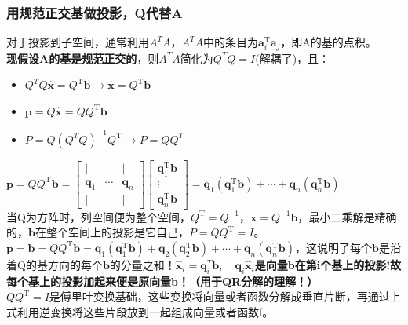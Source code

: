     \subsubsection{用规范正交基做投影，Q代替A}
    对于投影到子空间，通常利用$A^T A$，$A^T A$中的条目为$\boldsymbol{a}_{i}^{\mathrm{T}} \boldsymbol{a}_{j}$，即A的基的点积。\\
    \textbf{现假设A的基是规范正交的}，则$A^T A$简化为$Q^T Q=I$(解耦了)，且：
    \begin{itemize}
        \item $Q^T Q\widehat{\boldsymbol{x}}=Q^{\mathrm{T}} \boldsymbol{b} \rightarrow \widehat{\boldsymbol{x}}=Q^{\mathrm{T}} \boldsymbol{b}$
        \item $\bm{p}=Q \widehat{\bm{x}} = Q Q^{\mathrm{T}} \bm{b}$
        \item $P=Q(Q^T Q)^{-1}Q^{\mathrm{T}} \rightarrow P=Q Q^T$
    \end{itemize}
    $\boldsymbol{p}=Q Q^{\mathrm{T}} \bm{b}=\left[\begin{array}{lll}{|} & {} & { |} \\ {\bm{q}_{1}} & {\cdots} & {\bm{q}_{n}} \\ { |} & {} & { |}\end{array}\right]\left[\begin{array}{c}{\bm{q}_{1}^{\mathrm{T}} \bm{b}} \\ {\vdots} \\ {\bm{q}_{n}^{\mathrm{T}} \bm{b}}\end{array}\right]=\boldsymbol{q}_{1}\left(\boldsymbol{q}_{1}^{\mathrm{T}} \boldsymbol{b}\right)+\cdots+\boldsymbol{q}_{n}\left(\boldsymbol{q}_{n}^{\mathrm{T}} \boldsymbol{b}\right)$
    \\
    当Q为方阵时，列空间便为整个空间，$Q^{\mathrm{T}}=Q^{-1}$，$\boldsymbol{x}=Q^{-1} \boldsymbol{b}$，最小二乘解是精确的，$\bm{b}$在整个空间上的投影是它自己，$P=Q Q^{\mathrm{T}}=I$。
    \\
    $\boldsymbol{p}=\boldsymbol{b}=Q Q^{\mathrm{T}} \bm{b}=\bm{q}_{1}\left(\bm{q}_{1}^{\mathrm{T}} \bm{b}\right)+\bm{q}_{2}\left(\bm{q}_{2}^{\mathrm{T}} \bm{b}\right)+\cdots+\bm{q}_{n}\left(\bm{q}_{n}^{\mathrm{T}} \bm{b}\right)$，这说明了每个$\bm{b}$是沿着Q的基方向的每个$\bm{b}$的分量之和！$\widehat{\bm{x}}_i = \bm{q}^T_{i} \bm{b}, \quad \bm{q}_i \widehat{\bm{x}}_i$\textbf{是向量b在第i个基上的投影!故每个基上的投影加起来便是原向量b！（用于QR分解的理解！）}
    \\
    $Q Q^{\mathrm{T}}=I$是傅里叶变换基础，这些变换将向量或者函数分解成垂直片断，再通过上式利用逆变换将这些片段放到一起组成向量或者函数f。


